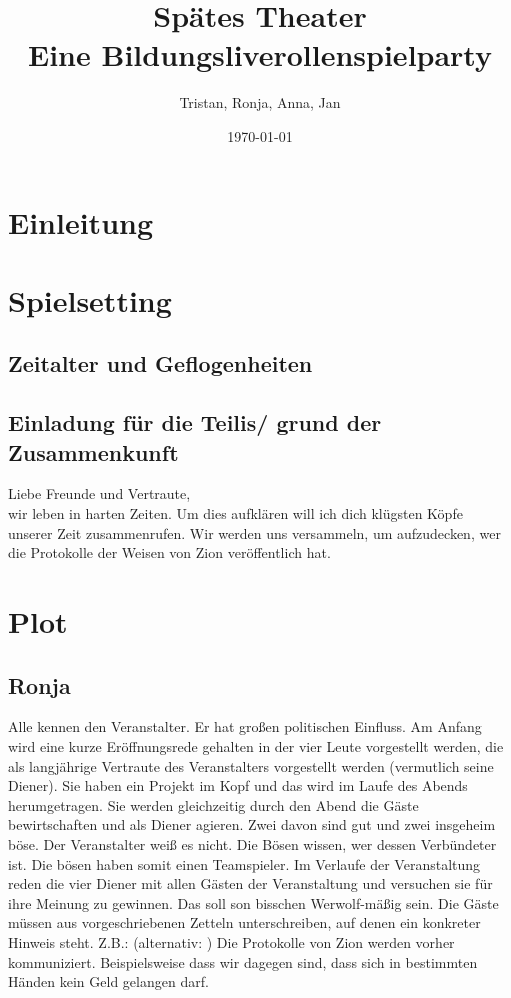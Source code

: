 \documentclass[12pt, a4paper, openany]{report}
\title{
    {\textbf{Spätes Theater}}\\
    {\large{Eine Bildungsliverollenspielparty}}\\
}
\author{Tristan, Ronja, Anna, Jan}
\date{\today}
\begin{document}
\maketitle
\frontmatter
\tableofcontents
\mainmatter

\chapter{Einleitung}

\chapter{Spielsetting}

\section{Zeitalter und Geflogenheiten}

\section{Einladung für die Teilis/ grund der Zusammenkunft}
Liebe Freunde und Vertraute,\\
wir leben in harten Zeiten. 
Um dies aufklären will ich dich klügsten Köpfe unserer Zeit zusammenrufen. 
Wir werden uns versammeln, um aufzudecken, wer die Protokolle der Weisen von Zion veröffentlich hat. 

\chapter{Plot}

\section{Ronja}
Alle kennen den Veranstalter. 
Er hat großen politischen Einfluss. 
Am Anfang wird eine kurze Eröffnungsrede gehalten in der vier Leute vorgestellt werden, die als langjährige Vertraute des Veranstalters vorgestellt werden (vermutlich seine Diener).
Sie haben ein Projekt im Kopf und das wird im Laufe des Abends herumgetragen. 
Sie werden gleichzeitig durch den Abend die Gäste bewirtschaften und als Diener agieren.
Zwei davon sind gut und zwei insgeheim böse. 
Der Veranstalter weiß es nicht. 
Die Bösen wissen, wer dessen Verbündeter ist.
Die bösen haben somit einen Teamspieler. 
Im Verlaufe der Veranstaltung reden die vier Diener mit allen Gästen der Veranstaltung und versuchen sie für ihre Meinung zu gewinnen. 
Das soll son bisschen Werwolf-mäßig sein. 
Die Gäste müssen aus vorgeschriebenen Zetteln unterschreiben, auf denen ein konkreter Hinweis steht.
Z.B.:  (alternativ: )
Die Protokolle von Zion werden vorher kommuniziert. 
Beispielsweise dass wir dagegen sind, dass sich in bestimmten Händen kein Geld gelangen darf.\\
\end{document}
